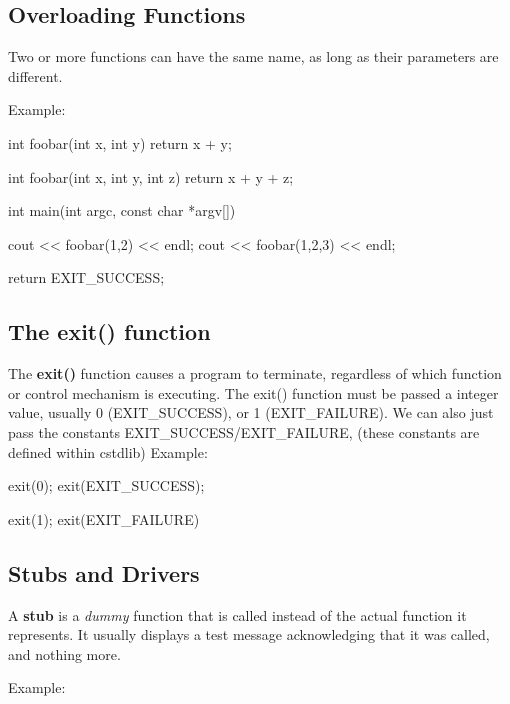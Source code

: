 \documentclass{report}
\begin{document}
    
    \bigbreak \noindent 
    \bigbreak \noindent 

    \pagebreak \bigbreak \noindent 
    \subsection{Overloading Functions}
    \bigbreak \noindent 
    \begin{concept}
 Two or more functions can have the same name, as long as their parameters are different.
	\end{concept}
    \bigbreak \noindent 
    Example:
    \bigbreak \noindent 
    
    \begin{cppcode}
int foobar(int x, int y) { return x + y; }

int foobar(int x, int y, int z) { return x + y + z; }

int main(int argc, const char *argv[]) {

    cout << foobar(1,2) << endl;
    cout << foobar(1,2,3) << endl;

    return EXIT_SUCCESS;
}
    \end{cppcode}
    

    \bigbreak \noindent \bigbreak \noindent 
    \subsection{The exit() function}
    \bigbreak \noindent 
    \begin{concept}

	\end{concept}
    \bigbreak \noindent 
    The \textbf{exit()} function causes a program to terminate, regardless of which function or control mechanism is executing.
    \bigbreak \noindent 
    \bigbreak \noindent 
    The exit() function must be passed a integer value, usually 0 (EXIT\_SUCCESS), or 1 (EXIT\_FAILURE). We can also just pass the constants EXIT\_SUCCESS/EXIT\_FAILURE, (these constants are defined within cstdlib)
    Example:
    \bigbreak \noindent 
    
    \begin{cppcode}
exit(0);
exit(EXIT_SUCCESS);

exit(1);
exit(EXIT_FAILURE)
    \end{cppcode}
    

    \pagebreak \bigbreak \noindent 
    \subsection{Stubs and Drivers}
    \bigbreak \noindent 
    \begin{concept}
 A \textbf{stub} is a \textit{dummy} function that is called instead of the actual function it represents. It usually displays a test message acknowledging that it was called, and nothing more.
	\end{concept}
    \bigbreak \noindent 
    Example:
    \bigbreak \noindent 
    
\end{document}
